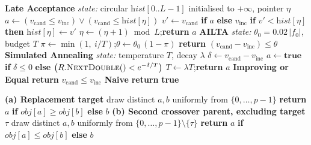 \begin{algorithm}[htbp]
\caption{Acceptance criteria. All take the incumbent and candidate objectives and
return a Boolean. $L = 50$ is the Late Acceptance list length.}
\label{alg:acceptance}
\begin{algorithmic}[1]
\Statex \textbf{Late Acceptance} \quad\textit{state:} circular $\textit{hist}[0..L{-}1]$
        initialised to $+\infty$, pointer $\eta$
\State $a \gets (v_{\text{cand}} \leq v_{\text{inc}}) \lor (v_{\text{cand}} \leq \textit{hist}[\eta])$
\State $v' \gets v_{\text{cand}}$ \textbf{if} $a$ \textbf{else} $v_{\text{inc}}$
\State \textbf{if} $v' < \textit{hist}[\eta]$ \textbf{then} $\textit{hist}[\eta] \gets v'$
\State $\eta \gets (\eta + 1) \bmod L$;\quad \textbf{return} $a$
\Statex
\Statex \textbf{AILTA} \quad\textit{state:} $\theta_0 = 0.02\,|f_0|$, budget $T$
\State $\pi \gets \min(1,\ i/T)$;\quad $\theta \gets \theta_0\,(1-\pi)$
\State \textbf{return} $(v_{\text{cand}} - v_{\text{inc}}) \leq \theta$
\Statex
\Statex \textbf{Simulated Annealing} \quad\textit{state:} temperature $T$, decay $\lambda$
\State $\delta \gets v_{\text{cand}} - v_{\text{inc}}$
\State $a \gets \textbf{true}$ \textbf{if} $\delta \leq 0$
       \textbf{else} $\big(R.\textsc{NextDouble}() < e^{-\delta/T}\big)$
\State $T \gets \lambda T$;\quad \textbf{return} $a$
\Statex
\Statex \textbf{Improving or Equal} \quad \textbf{return} $v_{\text{cand}} \leq v_{\text{inc}}$
\Statex \textbf{Naive} \quad \textbf{return} \textbf{true}
\end{algorithmic}
\end{algorithm}

\begin{algorithm}[htbp]
\caption{Binary tournament selection used by the multi-point hyper-heuristic. The
asymmetry is deliberate: replacing the \emph{worse} individual maximises expected benefit,
while the \emph{better} individual supplies crossover material.}
\label{alg:tournament}
\begin{algorithmic}[1]
\Statex \textbf{(a) Replacement target}
\State draw distinct $a, b$ uniformly from $\{0, \ldots, p-1\}$
\State \textbf{return} $a$ \textbf{if} $\textit{obj}[a] \geq \textit{obj}[b]$ \textbf{else} $b$
\Statex
\Statex \textbf{(b) Second crossover parent, excluding target $\tau$}
\State draw distinct $a, b$ uniformly from $\{0, \ldots, p-1\} \setminus \{\tau\}$
\State \textbf{return} $a$ \textbf{if} $\textit{obj}[a] \leq \textit{obj}[b]$ \textbf{else} $b$
\end{algorithmic}
\end{algorithm}
